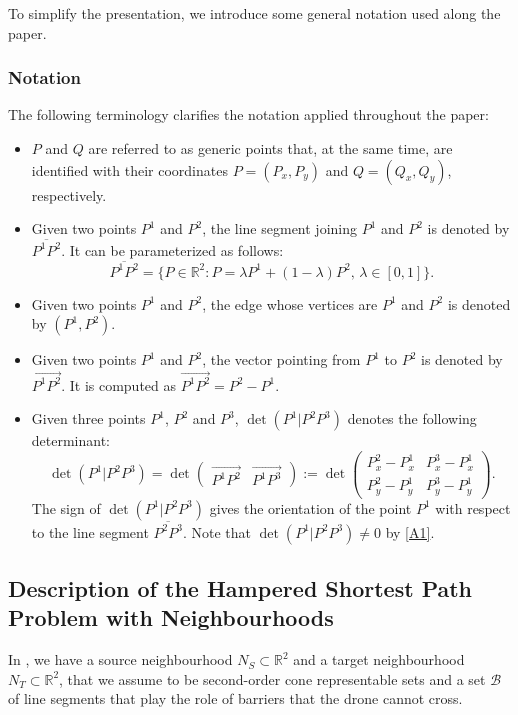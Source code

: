 \documentclass[a4paper,  review, authoryear, 1p.]{elsarticle}
\newcommand{\SPPN}{{\sf{H-SPPN}\xspace }}
\newcommand{\segment}[2]{\overline{#1#2}}
\newcommand{\determinant}[3]{\det({#1|#2#3})}
\begin{document}
		To simplify the presentation, we introduce some general notation used along the paper.
		\subsubsection*{Notation} 
		
		The following terminology clarifies the notation applied throughout the paper: 
		\begin{itemize}
			\item $P$ and $Q$ are referred to as generic points that, at the same time, are identified with their coordinates $P=(P_x, P_y)$ and $Q=(Q_x, Q_y)$, respectively.
			\item Given two points $P^1$ and $P^2$, the line segment joining $P^1$ and $P^2$ is denoted by $\segment{P^1}{P^2}$. It can be parameterized as follows:
			$$\segment{P^1}{P^2}=\{P\in\mathbb R^2:P=\lambda P^1 + (1-\lambda)P^2,\,\lambda\in[0,1]\}.$$
			\item  Given two points $P^1$ and $P^2$, the edge whose vertices are $P^1$ and $P^2$ is denoted by $(P^1, P^2)$.
			\item  Given two points $P^1$ and $P^2$, the vector pointing from $P^1$ to $P^2$ is denoted by $\overrightarrow{P^1P^2}$. It is computed as
			$\overrightarrow{P^1P^2}=P^2-P^1.$
			\item Given three points $P^1$, $P^2$ and $P^3$, $\determinant{P^1}{P^2}{P^3}$ denotes the following determinant:
			$$
			\determinant{P^1}{P^2}{P^3}=\det\left(\begin{array}{c|c} \overrightarrow{P^1P^2} & \overrightarrow{P^1P^3}\end{array}\right):=\det\left( \begin{array}{cc}  P^2_x-P^1_x & P^3_x-P^1_x \\ P_y^2-P^1_y & P_y^3-P_y^1 \end{array}\right).
			$$
			The sign of $\determinant{P^1}{P^2}{P^3}$ gives the orientation of the point $P^1$ with respect to the line segment $\segment{P^2}{P^3}.$ Note that $\determinant{P^1}{P^2}{P^3}\neq 0$ by \ref{A1}. 
		\end{itemize}
		
		
		\subsection{Description of the Hampered Shortest Path Problem with Neighbourhoods}\label{subsection:descriptionHSPPN}
		In \SPPN, we have a source neighbourhood $N_S\subset\mathbb R^2$ and a target neighbourhood $N_T\subset\mathbb R^2$, that we assume to be second-order cone representable sets and a set $\mathcal B$ of line segments that play the role of barriers that the drone cannot cross. 
		
\end{document}
